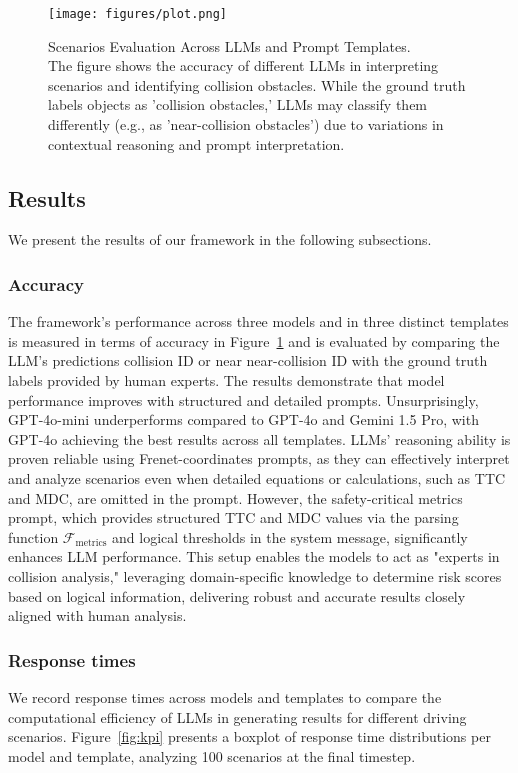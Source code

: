 \begin{figure}[ht]
    \centering
    \texttt{[image: figures/plot.png]} 
    \caption{
        Scenarios Evaluation Across LLMs and Prompt Templates.\\
        The figure shows the accuracy of different LLMs in interpreting scenarios and identifying collision obstacles. While the ground truth labels objects as 'collision obstacles,' LLMs may classify them differently (e.g., as 'near-collision obstacles') due to variations in contextual reasoning and prompt interpretation.
    }
    \label{fig:plot} %
\end{figure}

\subsection{Results}
We present the results of our framework in the following subsections.

\subsubsection{Accuracy}
The framework's performance across three models and in three distinct templates is measured in terms of accuracy in Figure~\ref{fig:plot} and is evaluated by comparing the LLM's predictions collision ID or near near-collision ID with the ground truth labels provided by human experts. 
The results demonstrate that model performance improves with structured and detailed prompts. Unsurprisingly, GPT-4o-mini underperforms compared to GPT-4o and Gemini 1.5 Pro, with GPT-4o achieving the best results across all templates. LLMs' reasoning ability is proven reliable using Frenet-coordinates prompts, as they can effectively interpret and analyze scenarios even when detailed equations or calculations, such as TTC and MDC, are omitted in the prompt. 
However, the safety-critical metrics prompt, which provides structured TTC and MDC values via the parsing function $\mathcal{F}_{\text{metrics}}$ and logical thresholds in the system message, significantly enhances LLM performance. This setup enables the models to act as "experts in collision analysis," leveraging domain-specific knowledge to determine risk scores based on logical information, delivering robust and accurate results closely aligned with human analysis.
\subsubsection{Response times}
We record response times across models and templates to compare the computational efficiency of LLMs in generating results for different driving scenarios. Figure~\ref{fig:kpi} presents a boxplot of response time distributions per model and template, analyzing 100 scenarios at the final timestep. 

